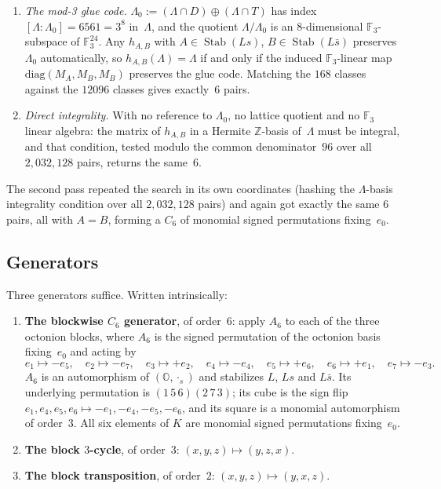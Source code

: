 \documentclass[11pt]{amsart}
\newcommand{\LL}{\Lambda}
\newcommand{\OO}{\mathbb{O}}
\newcommand{\ZZ}{\mathbb{Z}}
\newcommand{\FF}{\mathbb{F}}
\DeclareMathOperator{\Stab}{Stab}
\theoremstyle{definition}
\theoremstyle{remark}
\begin{document}
\begin{enumerate}[label=\textbf{M\arabic*.}, leftmargin=*]
\item \emph{The mod-3 glue code.} $\LL_0 := (\LL \cap D) \oplus (\LL \cap T)$
  has index $[\LL : \LL_0] = 6561 = 3^8$ in~$\LL$, and the quotient
  $\LL/\LL_0$ is an $8$-dimensional $\FF_3$-subspace of $\FF_3^{24}$. Any
  $h_{A,B}$ with $A \in \Stab(Ls)$, $B \in \Stab(L\bar s)$ preserves $\LL_0$
  automatically, so $h_{A,B}(\LL) = \LL$ if and only if the induced
  $\FF_3$-linear map $\mathrm{diag}(M_A, M_B, M_B)$ preserves the glue code.
  Matching the $168$ classes against the $12096$ classes gives exactly~$6$
  pairs.
\item \emph{Direct integrality.} With no reference to $\LL_0$, no lattice
  quotient and no $\FF_3$ linear algebra: the matrix of $h_{A,B}$ in a Hermite
  $\ZZ$-basis of~$\LL$ must be integral, and that condition, tested modulo the
  common denominator~$96$ over all $2{,}032{,}128$ pairs, returns the same~$6$.
\end{enumerate}

The second pass repeated the search in its own coordinates (hashing the
$\LL$-basis integrality condition over all $2{,}032{,}128$ pairs) and again got
exactly the same $6$ pairs, all with $A = B$, forming a $C_6$ of monomial
signed permutations fixing~$e_0$.

\subsection{Generators}

Three generators suffice. Written intrinsically:

\begin{enumerate}[label=(\arabic*), leftmargin=*]
\item \textbf{The blockwise $C_6$ generator}, of order~$6$: apply
  $A_6$ to each of the three octonion blocks, where $A_6$ is the signed
  permutation of the octonion basis fixing~$e_0$ and acting by
  \[
    e_1 \mapsto -e_5, \quad e_2 \mapsto -e_7, \quad e_3 \mapsto +e_2, \quad
    e_4 \mapsto -e_4, \quad e_5 \mapsto +e_6, \quad e_6 \mapsto +e_1, \quad
    e_7 \mapsto -e_3 .
  \]
  $A_6$ is an automorphism of $(\OO, \cdot_s)$ and stabilizes $L$, $Ls$ and
  $L\bar s$. Its underlying permutation is $(1\,5\,6)(2\,7\,3)$; its cube is
  the sign flip $e_1, e_4, e_5, e_6 \mapsto -e_1, -e_4, -e_5, -e_6$, and its
  square is a monomial automorphism of order~$3$. All six elements of $K$ are
  monomial signed permutations fixing~$e_0$.
\item \textbf{The block $3$-cycle}, of order~$3$: $(x,y,z) \mapsto (y,z,x)$.
\item \textbf{The block transposition}, of order~$2$: $(x,y,z) \mapsto (y,x,z)$.
\end{enumerate}
\end{document}
